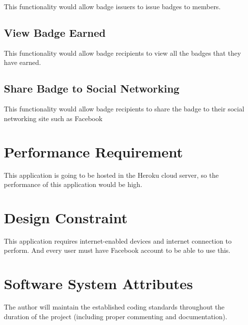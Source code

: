 This functionality would allow badge issuers to issue badges to members. 

\subsection{View Badge Earned}

This functionality would allow badge recipients to view all the badges that they have earned.

\subsection{Share Badge to Social Networking} 

This functionality would allow badge recipients to share the badge to their social networking site such as Facebook

\section{Performance Requirement}

This application is going to be hosted in the Heroku cloud server, so the performance of this application would be high.
 
\section{Design Constraint}

This application requires internet-enabled devices and internet connection to perform. And every user must have Facebook account to be able to use this. 

\section{Software System Attributes}

The author will maintain the established coding standards throughout the duration of the project (including proper commenting and documentation).

